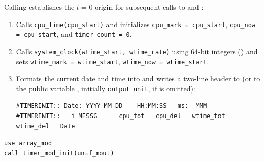 Calling  establishes the $t = 0$ origin for subsequent calls to  and :
\begin{enumerate}
  \item Calls \texttt{cpu\_time(cpu\_start)} and initializes \texttt{cpu\_mark = cpu\_start}, \texttt{cpu\_now = cpu\_start}, and \texttt{timer\_count = 0}.
  \item Calls \texttt{system\_clock(wtime\_start, wtime\_rate)} using 64-bit integers () and sets \texttt{wtime\_mark = wtime\_start}, \texttt{wtime\_now = wtime\_start}.
  \item Formats the current date and time into  and writes a two-line header to  (or to the public variable , initially \texttt{output\_unit}, if  is omitted):
\begin{verbatim}
#TIMERINIT:: Date: YYYY-MM-DD    HH:MM:SS   ms:  MMM
#TIMERINIT::   i MESSG      cpu_tot   cpu_del   wtime_tot   wtime_del   Date
\end{verbatim}
\end{enumerate}

\begin{description}[leftmargin=2.2cm, style=nextline]
\end{description}

\lstset{language=[95]Fortran}
\begin{lstlisting}
use array_mod
call timer_mod_init(un=f_mout)
\end{lstlisting}



